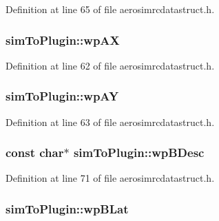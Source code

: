 Definition at line 65 of file aerosimrcdatastruct.\-h.

\hypertarget{group___aero_sim_r_c_gaeee88b74290e9df5d3c70d111c9375cc}{
\subsubsection[{wp\-A\-X}]{ sim\-To\-Plugin\-::wp\-A\-X}}\label{group___aero_sim_r_c_gaeee88b74290e9df5d3c70d111c9375cc}


Definition at line 62 of file aerosimrcdatastruct.\-h.

\hypertarget{group___aero_sim_r_c_gaf5e140b64d5e9eae533fd3c0195c0fa8}{
\subsubsection[{wp\-A\-Y}]{ sim\-To\-Plugin\-::wp\-A\-Y}}\label{group___aero_sim_r_c_gaf5e140b64d5e9eae533fd3c0195c0fa8}


Definition at line 63 of file aerosimrcdatastruct.\-h.

\hypertarget{group___aero_sim_r_c_ga847521c9c396ca010d434dde9d9c33ee}{
\subsubsection[{wp\-B\-Desc}]{\setlength{\rightskip}{0pt plus 5cm}const char$\ast$ sim\-To\-Plugin\-::wp\-B\-Desc}}\label{group___aero_sim_r_c_ga847521c9c396ca010d434dde9d9c33ee}


Definition at line 71 of file aerosimrcdatastruct.\-h.

\hypertarget{group___aero_sim_r_c_gad362dcc92c44981f1062410b4d0105d8}{
\subsubsection[{wp\-B\-Lat}]{ sim\-To\-Plugin\-::wp\-B\-Lat}}\label{group___aero_sim_r_c_gad362dcc92c44981f1062410b4d0105d8}


